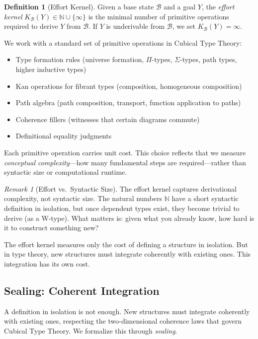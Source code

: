 \documentclass[11pt]{article}
\theoremstyle{definition}
\newtheorem{definition}[theorem]{Definition}
\theoremstyle{remark}
\newtheorem{remark}[theorem]{Remark}
\newcommand{\N}{\mathbb{N}}
\begin{document}
\begin{definition}[Effort Kernel]
\label{def:effort-kernel}
Given a base state $\mathcal{B}$ and a goal $Y$, the \emph{effort kernel} $K_{\mathcal{B}}(Y) \in \N \cup \{\infty\}$ is the minimal number of primitive operations required to derive $Y$ from $\mathcal{B}$. If $Y$ is underivable from $\mathcal{B}$, we set $K_{\mathcal{B}}(Y) = \infty$.
\end{definition}

We work with a standard set of primitive operations in Cubical Type Theory:
\begin{itemize}[leftmargin=*]
\item Type formation rules (universe formation, $\Pi$-types, $\Sigma$-types, path types, higher inductive types)
\item Kan operations for fibrant types (composition, homogeneous composition)
\item Path algebra (path composition, transport, function application to paths)
\item Coherence fillers (witnesses that certain diagrams commute)
\item Definitional equality judgments
\end{itemize}

Each primitive operation carries unit cost. This choice reflects that we measure \emph{conceptual complexity}---how many fundamental steps are required---rather than syntactic size or computational runtime.

\begin{remark}[Effort vs.\ Syntactic Size]
The effort kernel captures derivational complexity, not syntactic size. The natural numbers $\N$ have a short syntactic definition in isolation, but once dependent types exist, they become trivial to derive (as a W-type). What matters is: given what you already know, how hard is it to construct something new?
\end{remark}

The effort kernel measures only the cost of defining a structure in isolation. But in type theory, new structures must integrate coherently with existing ones. This integration has its own cost.

\subsection{Sealing: Coherent Integration}

A definition in isolation is not enough. New structures must integrate coherently with existing ones, respecting the two-dimensional coherence laws that govern Cubical Type Theory. We formalize this through \emph{sealing}.
\end{document}
